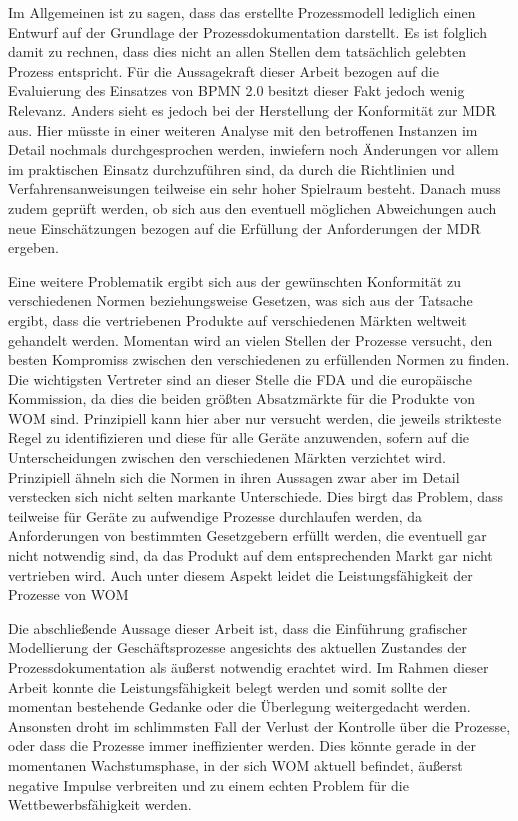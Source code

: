 \documentclass[a4paper,12pt]{report}
\begin{document}
Im Allgemeinen ist zu sagen, dass das erstellte Prozessmodell lediglich einen Entwurf auf der Grundlage der Prozessdokumentation darstellt. Es ist folglich damit zu rechnen, dass dies nicht an allen Stellen dem tatsächlich gelebten Prozess entspricht. Für die Aussagekraft dieser Arbeit bezogen auf die Evaluierung des Einsatzes von BPMN 2.0 besitzt dieser Fakt jedoch wenig Relevanz. Anders sieht es jedoch bei der Herstellung der Konformität zur MDR aus. Hier müsste in einer weiteren Analyse mit den betroffenen Instanzen im Detail nochmals durchgesprochen werden, inwiefern noch Änderungen vor allem im praktischen Einsatz durchzuführen sind, da durch die Richtlinien und Verfahrensanweisungen teilweise ein sehr hoher Spielraum besteht. Danach muss zudem geprüft werden, ob sich aus den eventuell möglichen Abweichungen auch neue Einschätzungen bezogen auf die Erfüllung der Anforderungen der MDR ergeben.

Eine weitere Problematik ergibt sich aus der gewünschten Konformität zu verschiedenen Normen beziehungsweise Gesetzen, was sich aus der Tatsache ergibt, dass die vertriebenen Produkte auf verschiedenen Märkten weltweit gehandelt werden. Momentan wird an vielen Stellen der Prozesse versucht, den besten Kompromiss zwischen den verschiedenen zu erfüllenden Normen zu finden. Die wichtigsten Vertreter sind an dieser Stelle die FDA und die europäische Kommission, da dies die beiden größten Absatzmärkte für die Produkte von WOM sind. Prinzipiell kann hier aber nur versucht werden, die jeweils strikteste Regel zu identifizieren und diese für alle Geräte anzuwenden, sofern auf die Unterscheidungen zwischen den verschiedenen Märkten verzichtet wird. Prinzipiell ähneln sich die Normen in ihren Aussagen zwar aber im Detail verstecken sich nicht selten markante Unterschiede. Dies birgt das Problem, dass teilweise für Geräte zu aufwendige Prozesse durchlaufen werden, da Anforderungen von bestimmten Gesetzgebern erfüllt werden, die eventuell gar nicht notwendig sind, da das Produkt auf dem entsprechenden Markt gar nicht vertrieben wird. Auch unter diesem Aspekt leidet die Leistungsfähigkeit der Prozesse von WOM

Die abschließende Aussage dieser Arbeit ist, dass die Einführung grafischer Modellierung der Geschäftsprozesse angesichts des aktuellen Zustandes der Prozessdokumentation als äußerst notwendig erachtet wird. Im Rahmen dieser Arbeit konnte die Leistungsfähigkeit belegt werden und somit sollte der momentan bestehende Gedanke oder die Überlegung weitergedacht werden. Ansonsten droht im schlimmsten Fall der Verlust der Kontrolle über die Prozesse, oder dass die Prozesse immer ineffizienter werden. Dies könnte gerade in der momentanen Wachstumsphase, in der sich WOM aktuell befindet, äußerst negative Impulse verbreiten und zu einem echten Problem für die Wettbewerbsfähigkeit werden.
\end{document}
